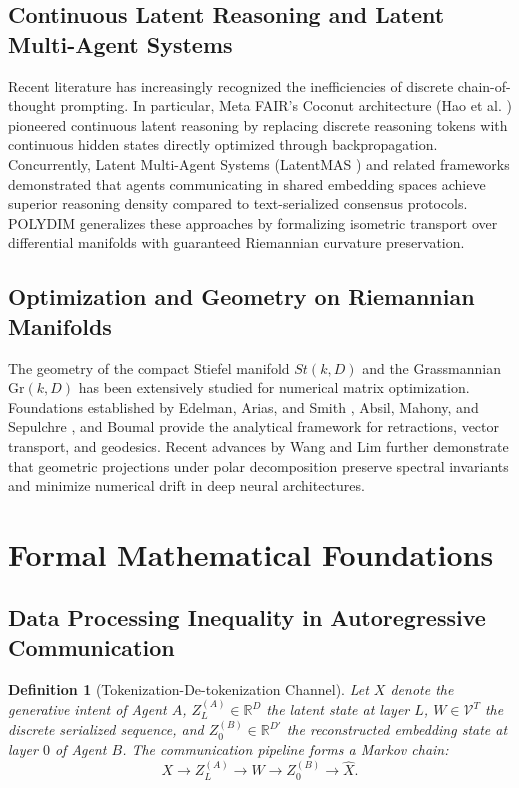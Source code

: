 \documentclass[journal,twocolumn]{IEEEtran}
\newtheorem{definition}{Definition}
\begin{document}
\subsection{Continuous Latent Reasoning and Latent Multi-Agent Systems}
Recent literature has increasingly recognized the inefficiencies of discrete chain-of-thought prompting. In particular, Meta FAIR's Coconut architecture (Hao et al. \cite{hao2024coconut}) pioneered continuous latent reasoning by replacing discrete reasoning tokens with continuous hidden states directly optimized through backpropagation. Concurrently, Latent Multi-Agent Systems (LatentMAS \cite{latentmas2024}) and related frameworks demonstrated that agents communicating in shared embedding spaces achieve superior reasoning density compared to text-serialized consensus protocols. POLYDIM generalizes these approaches by formalizing isometric transport over differential manifolds with guaranteed Riemannian curvature preservation.

\subsection{Optimization and Geometry on Riemannian Manifolds}
The geometry of the compact Stiefel manifold $St(k, D)$ and the Grassmannian $\mathrm{Gr}(k, D)$ has been extensively studied for numerical matrix optimization. Foundations established by Edelman, Arias, and Smith \cite{edelman1998geometry}, Absil, Mahony, and Sepulchre \cite{absil2008optimization}, and Boumal \cite{boumal2023introduction} provide the analytical framework for retractions, vector transport, and geodesics. Recent advances by Wang and Lim \cite{wang2026stiefel} further demonstrate that geometric projections under polar decomposition preserve spectral invariants and minimize numerical drift in deep neural architectures.

\section{Formal Mathematical Foundations}

\subsection{Data Processing Inequality in Autoregressive Communication}

\begin{definition}[Tokenization-De-tokenization Channel]
Let $X$ denote the generative intent of Agent $A$, $Z_L^{(A)} \in \mathbb{R}^D$ the latent state at layer $L$, $W \in \mathcal{V}^T$ the discrete serialized sequence, and $Z_0^{(B)} \in \mathbb{R}^{D'}$ the reconstructed embedding state at layer $0$ of Agent $B$. The communication pipeline forms a Markov chain:
\begin{equation}
X \longrightarrow Z_L^{(A)} \longrightarrow W \longrightarrow Z_0^{(B)} \longrightarrow \hat{X}.
\end{equation}
\end{definition}
\end{document}
